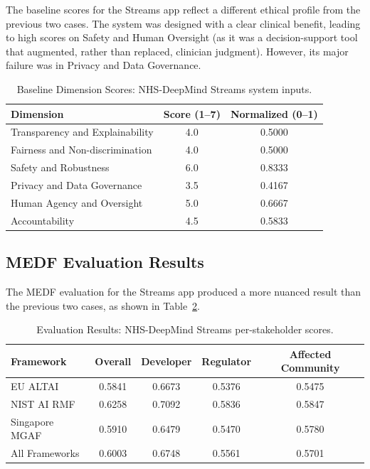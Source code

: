 The baseline scores for the Streams app reflect a different ethical profile from the previous two cases. The system was designed with a clear clinical benefit, leading to high scores on Safety and Human Oversight (as it was a decision-support tool that augmented, rather than replaced, clinician judgment). However, its major failure was in Privacy and Data Governance.

\begin{table}[H]
\centering
\caption{Baseline Dimension Scores: NHS-DeepMind Streams system inputs.}
\label{tab:cs3_baseline}
\begin{tabular}{@{}lcc@{}}
\toprule
\textbf{Dimension} & \textbf{Score (1--7)} & \textbf{Normalized (0--1)} \\
\midrule
Transparency and Explainability   & 4.0 & 0.5000 \\
Fairness and Non-discrimination   & 4.0 & 0.5000 \\
Safety and Robustness             & 6.0 & 0.8333 \\
Privacy and Data Governance       & 3.5 & 0.4167 \\
Human Agency and Oversight        & 5.0 & 0.6667 \\
Accountability                    & 4.5 & 0.5833 \\
\bottomrule
\end{tabular}
\end{table}

\subsection{MEDF Evaluation Results}

The MEDF evaluation for the Streams app produced a more nuanced result than the previous two cases, as shown in Table~\ref{tab:cs3_results}.

\begin{table}[H]
\centering
\caption{Evaluation Results: NHS-DeepMind Streams per-stakeholder scores.}
\label{tab:cs3_results}
\begin{tabular}{@{}lcccc@{}}
\toprule
\textbf{Framework} & \textbf{Overall} & \textbf{Developer} & \textbf{Regulator} & \textbf{Affected Community} \\
\midrule
EU ALTAI        & 0.5841 & 0.6673 & 0.5376 & 0.5475 \\
NIST AI RMF     & 0.6258 & 0.7092 & 0.5836 & 0.5847 \\
Singapore MGAF  & 0.5910 & 0.6479 & 0.5470 & 0.5780 \\
\midrule
All Frameworks  & 0.6003 & 0.6748 & 0.5561 & 0.5701 \\
\bottomrule
\end{tabular}
\end{table}

